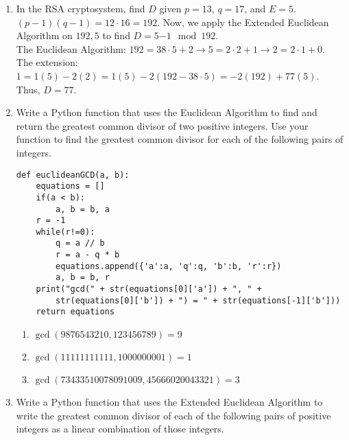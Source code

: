 \documentclass{article}
\begin{document}
\begin{enumerate}
        First, we use the Euclidean algorithm to check $gcd(50, 127)$. $127 = 2\cdot50 + 27 \to 50 = 1\cdot27 + 23 \to 27 = 1\cdot23 + 4 \to 23 = 5\cdot4 + 3 \to 4 = 1\cdot3 + 1 \to 3 = 3\cdot1 + 0$. Thus, $gcd(50, 127) = 1$.\\
        Then, we use the Extended Euclidean Algorithm to solve for $x$ and $y$. $1 = 1(4) - 1(3) = 1(4) - 1(23 - 5\cdot4) = -1(23) + 6(4) = -1(23) + 6(27 - 1\cdot23) = 6(27) - 7(23) = 6(27) - 7(50-1\cdot27) = -7(50) + 13(27) = -7(50) + 13(127 - 2\cdot50) = 13(127) - 33(50)$. Thus, $50^{-1}\mod{127} = -33$.
        \item In the RSA cryptosystem, find $D$ given $p = 13$, $q = 17$, and $E = 5$.\\
        $(p-1)(q-1) = 12\cdot16 = 192$. Now, we apply the Extended Euclidean Algorithm on $192, 5$ to find $D = 5{-1} \mod{192}$.\\
        The Euclidean Algorithm: $192 = 38\cdot5 + 2 \to 5 = 2\cdot2 + 1 \to 2 = 2\cdot1 + 0$.\\
        The extension: $1 = 1(5) - 2(2) = 1(5) - 2(192 - 38\cdot5) = -2(192) + 77(5)$. Thus, $D = 77$.
        \item Write a Python function that uses the Euclidean Algorithm to find and return the greatest common divisor of two positive integers. Use your function to find the greatest common divisor for each of the following pairs of integers.
        \begin{verbatim}
def euclideanGCD(a, b):
    equations = []
    if(a < b):
        a, b = b, a
    r = -1
    while(r!=0):
        q = a // b
        r = a - q * b
        equations.append({'a':a, 'q':q, 'b':b, 'r':r})
        a, b = b, r
    print("gcd(" + str(equations[0]['a']) + ", " + 
        str(equations[0]['b']) + ") = " + str(equations[-1]['b']))
    return equations
        \end{verbatim}
        \begin{enumerate}
            \item $\gcd(9876543210, 123456789) = 9$
            \item $\gcd(11111111111, 1000000001) = 1$
            \item $\gcd(73433510078091009, 45666020043321) = 3$
        \end{enumerate}
        \item Write a Python function that uses the Extended Euclidean Algorithm to write the greatest common divisor of each of the following pairs of positive integers as a linear combination of those integers.

\end{enumerate}
\end{document}
